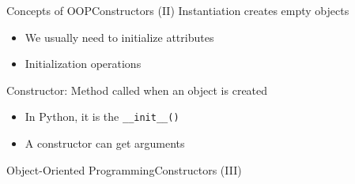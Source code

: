 \documentclass[10pt,compress]{beamer} %
\begin{document}
\begin{frame}{Concepts of OOP}{Constructors (II)}
		Instantiation creates empty objects
		\begin{itemize}
			\item We usually need to initialize attributes
			\item Initialization operations
		\end{itemize}
		\alert{Constructor}: Method called when an object is created
		\begin{itemize}
			\item In Python, it is the \texttt{\_\_init\_\_()}
			\item A constructor can get arguments
		\end{itemize}
\end{frame}

\begin{frame}{Object-Oriented Programming}{Constructors (III)}
	\vspace{-0.3cm}
	\begin{exampleblock}{}
	\vspace{-0.3cm}
		
	\end{exampleblock}
\end{frame}



\end{document}
